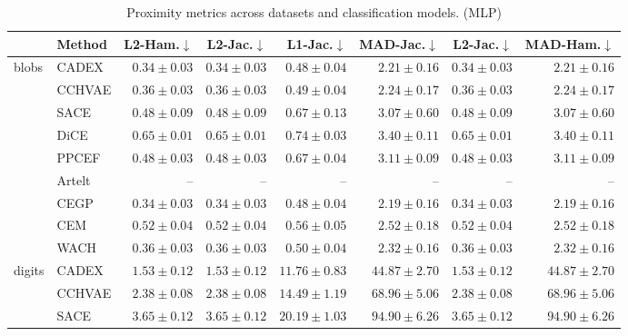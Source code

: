 \begin{table}[ht]
\centering
\caption{Proximity metrics across datasets and classification models. (MLP)}
\label{tab:proximity_metrics_mlpclassifier}
\begin{center}
\begin{sc}
\begin{scriptsize}
\begin{tabular}{l|l|rrrrrr}
\toprule
 & Method & L2-Ham.$\downarrow$ & L2-Jac.$\downarrow$ & L1-Jac.$\downarrow$ & MAD-Jac.$\downarrow$ & L2-Jac.$\downarrow$ & MAD-Ham.$\downarrow$ \\
\midrule
\multirow{9}{*}{blobs} & CADEX & $\boldsymbol{0.34\pm{0.03}}$ & $\boldsymbol{0.34\pm{0.03}}$ & $\boldsymbol{0.48\pm{0.04}}$ & $2.21\pm{0.16}$ & $\boldsymbol{0.34\pm{0.03}}$ & $2.21\pm{0.16}$ \\
 & CCHVAE & $0.36\pm{0.03}$ & $0.36\pm{0.03}$ & $0.49\pm{0.04}$ & $2.24\pm{0.17}$ & $0.36\pm{0.03}$ & $2.24\pm{0.17}$ \\
 & SACE & $0.48\pm{0.09}$ & $0.48\pm{0.09}$ & $0.67\pm{0.13}$ & $3.07\pm{0.60}$ & $0.48\pm{0.09}$ & $3.07\pm{0.60}$ \\
 & DiCE & $0.65\pm{0.01}$ & $0.65\pm{0.01}$ & $0.74\pm{0.03}$ & $3.40\pm{0.11}$ & $0.65\pm{0.01}$ & $3.40\pm{0.11}$ \\
 & PPCEF & $0.48\pm{0.03}$ & $0.48\pm{0.03}$ & $0.67\pm{0.04}$ & $3.11\pm{0.09}$ & $0.48\pm{0.03}$ & $3.11\pm{0.09}$ \\
 & Artelt & -- & -- & -- & -- & -- & -- \\
 & CEGP & $\boldsymbol{0.34\pm{0.03}}$ & $\boldsymbol{0.34\pm{0.03}}$ & $\boldsymbol{0.48\pm{0.04}}$ & $\boldsymbol{2.19\pm{0.16}}$ & $\boldsymbol{0.34\pm{0.03}}$ & $\boldsymbol{2.19\pm{0.16}}$ \\
 & CEM & $0.52\pm{0.04}$ & $0.52\pm{0.04}$ & $0.56\pm{0.05}$ & $2.52\pm{0.18}$ & $0.52\pm{0.04}$ & $2.52\pm{0.18}$ \\
 & WACH & $0.36\pm{0.03}$ & $0.36\pm{0.03}$ & $0.50\pm{0.04}$ & $2.32\pm{0.16}$ & $0.36\pm{0.03}$ & $2.32\pm{0.16}$ \\
\midrule
\multirow{9}{*}{digits} & CADEX & $\boldsymbol{1.53\pm{0.12}}$ & $\boldsymbol{1.53\pm{0.12}}$ & $11.76\pm{0.83}$ & $44.87\pm{2.70}$ & $\boldsymbol{1.53\pm{0.12}}$ & $44.87\pm{2.70}$ \\
 & CCHVAE & $2.38\pm{0.08}$ & $2.38\pm{0.08}$ & $14.49\pm{1.19}$ & $68.96\pm{5.06}$ & $2.38\pm{0.08}$ & $68.96\pm{5.06}$ \\
 & SACE & $3.65\pm{0.12}$ & $3.65\pm{0.12}$ & $20.19\pm{1.03}$ & $94.90\pm{6.26}$ & $3.65\pm{0.12}$ & $94.90\pm{6.26}$ \\

\end{tabular}
\end{scriptsize}
\end{sc}
\end{center}
\end{table}
